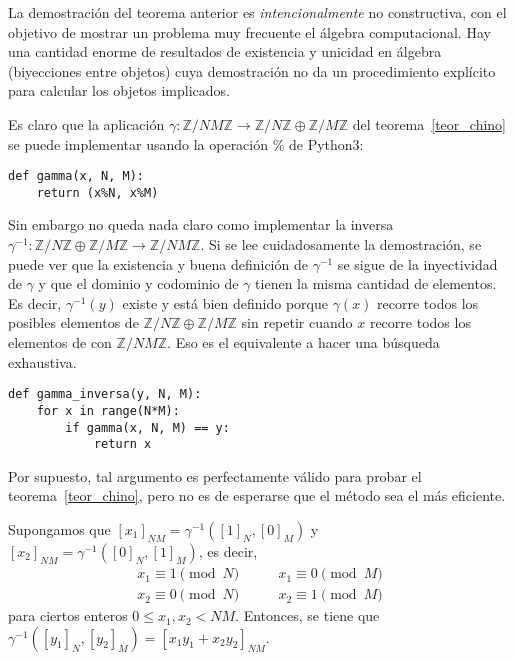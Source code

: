 \documentclass[a4paper, 11pt]{article}
\newcommand{\ZZ}{\mathbb{Z}}
\theoremstyle{plain}
\theoremstyle{definition}
\begin{document}
La demostración del teorema anterior es \textit{intencionalmente} no
constructiva, con el objetivo de mostrar un problema muy frecuente el álgebra
computacional. Hay una cantidad enorme de resultados de existencia y unicidad
en álgebra (biyecciones entre objetos) cuya demostración no da un procedimiento
explícito para calcular los objetos implicados.

\bigskip

Es claro que la aplicación $\gamma:\ZZ/NM\ZZ\to\ZZ/N\ZZ\oplus\ZZ/M\ZZ$ del
teorema~\ref{teor_chino} se puede implementar usando la operación $\%$ de
Python3:

\bigskip

\begin{lstlisting}
def gamma(x, N, M):
    return (x%N, x%M)
\end{lstlisting}

\bigskip

Sin embargo no queda nada claro como implementar la inversa
$\gamma^{-1}: \ZZ/N\ZZ\oplus\ZZ/M\ZZ\to\ZZ/NM\ZZ$. Si se lee cuidadosamente
la demostración, se puede ver que la existencia y buena definición de
$\gamma^{-1}$ se sigue de la inyectividad de $\gamma$ y que el dominio y
codominio de $\gamma$ tienen la misma cantidad de elementos. Es decir,
$\gamma^{-1}(y)$ existe y está bien definido porque $\gamma(x)$ recorre
todos los posibles elementos de $\ZZ/N\ZZ\oplus\ZZ/M\ZZ$ sin repetir cuando
$x$ recorre todos los elementos de  con $\ZZ/NM\ZZ$. Eso es el equivalente
a hacer una búsqueda exhaustiva.

\bigskip

\begin{lstlisting}
def gamma_inversa(y, N, M):
    for x in range(N*M):
        if gamma(x, N, M) == y:
            return x
\end{lstlisting}

\bigskip

Por supuesto, tal argumento es perfectamente válido para probar el 
teorema~\ref{teor_chino}, pero no es de esperarse que el método sea
el más eficiente.

\bigskip

Supongamos que $[x_1]_{NM}=\gamma^{-1}([1]_N,[0]_M)$ y
$[x_2]_{NM}=\gamma^{-1}([0]_N,[1]_M)$, es decir,
\begin{equation}\label{eq_interp}
\begin{aligned}
   x_1\equiv 1\pmod{N} \qquad &x_1\equiv 0\pmod{M} \\
   x_2\equiv 0\pmod{N} \qquad &x_2\equiv 1\pmod{M}
\end{aligned}
\end{equation}
para ciertos enteros $0\leq x_1,x_2<NM$. Entonces, se tiene que
$\gamma^{-1}([y_1]_N,[y_2]_M)=[x_1y_1+x_2y_2]_{NM}$.
\end{document}
